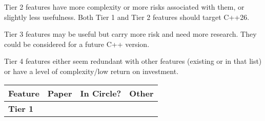 \documentclass{wg21}
\begin{document}
Tier 2 features have more complexity or more risks associated with them, or slightly less usefulness.
Both Tier 1 and Tier 2 features should target C++26.

Tier 3 features may be useful but carry more risk and need more research. They could be considered for a future C++ version.

Tier 4 features either seem redundant with other features (existing or in that list) or have a level of complexity/low return on investment.

\renewcommand{\arraystretch}{1.5}
\setlength\LTleft{-20mm}
\begin{longtable}{p{80mm}p{30mm}p{30mm}p{50mm}}\hline
    \hline
    Feature & Paper & In Circle? & Other\\
    \midrule
    \midrule
    \textbf{Tier 1} \\


\end{longtable}
\end{document}
